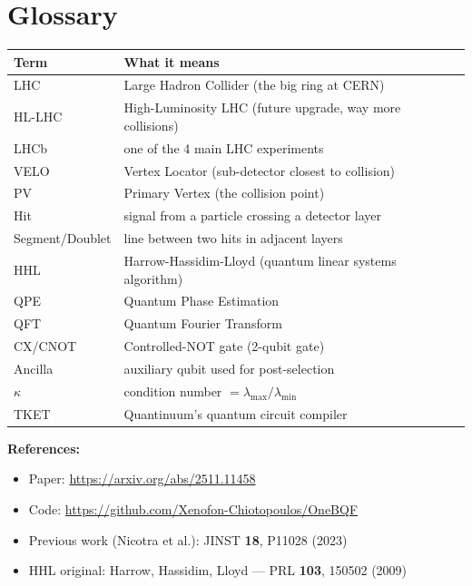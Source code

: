 \documentclass[11pt, a4paper]{article}
\begin{document}
\newpage
\section*{Glossary}

\begin{tabular}{ll}
\toprule
Term & What it means \\
\midrule
LHC & Large Hadron Collider (the big ring at CERN) \\
HL-LHC & High-Luminosity LHC (future upgrade, way more collisions) \\
LHCb & one of the 4 main LHC experiments \\
VELO & Vertex Locator (sub-detector closest to collision) \\
PV & Primary Vertex (the collision point) \\
Hit & signal from a particle crossing a detector layer \\
Segment/Doublet & line between two hits in adjacent layers \\
HHL & Harrow-Hassidim-Lloyd (quantum linear systems algorithm) \\
QPE & Quantum Phase Estimation \\
QFT & Quantum Fourier Transform \\
CX/CNOT & Controlled-NOT gate (2-qubit gate) \\
Ancilla & auxiliary qubit used for post-selection \\
$\kappa$ & condition number $= \lambda_{\max}/\lambda_{\min}$ \\
TKET & Quantinuum's quantum circuit compiler \\
\bottomrule
\end{tabular}

\bigskip
\noindent\textbf{References:}
\begin{itemize}
  \item Paper: \url{https://arxiv.org/abs/2511.11458}
  \item Code: \url{https://github.com/Xenofon-Chiotopoulos/OneBQF}
  \item Previous work (Nicotra et al.): JINST \textbf{18}, P11028 (2023)
  \item HHL original: Harrow, Hassidim, Lloyd --- PRL \textbf{103}, 150502
        (2009)
\end{itemize}
\end{document}
